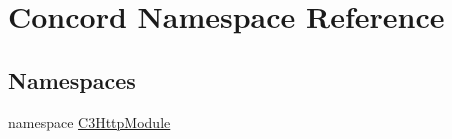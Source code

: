 \hypertarget{namespace_concord}{}\section{Concord Namespace Reference}
\label{namespace_concord}
\subsection*{Namespaces}
\begin{DoxyCompactItemize}
\item 
namespace \mbox{\hyperlink{namespace_concord_1_1_c3_http_module}{C3\+Http\+Module}}
\end{DoxyCompactItemize}
